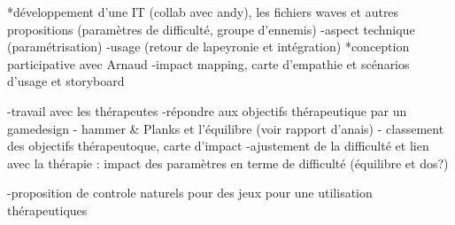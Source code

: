 	*développement d'une IT (collab avec andy), les fichiers waves et autres propositions (paramètres de difficulté, groupe d'ennemis)
		-aspect technique (paramétrisation) 
		-usage (retour de lapeyronie et intégration)
	*conception participative avec Arnaud 
		-impact mapping, carte d'empathie et scénarios d'usage et storyboard
	
	-travail avec les thérapeutes
	-répondre aux objectifs thérapeutique par un gamedesign
		- hammer \& Planks et l'équilibre (voir rapport d'anais)
		- classement des objectifs thérapeutoque, carte d'impact
	-ajustement de la difficulté et lien avec la thérapie : impact des paramètres en terme de difficulté (équilibre et dos?)
	
	-proposition de controle naturels pour des jeux pour une utilisation thérapeutiques
